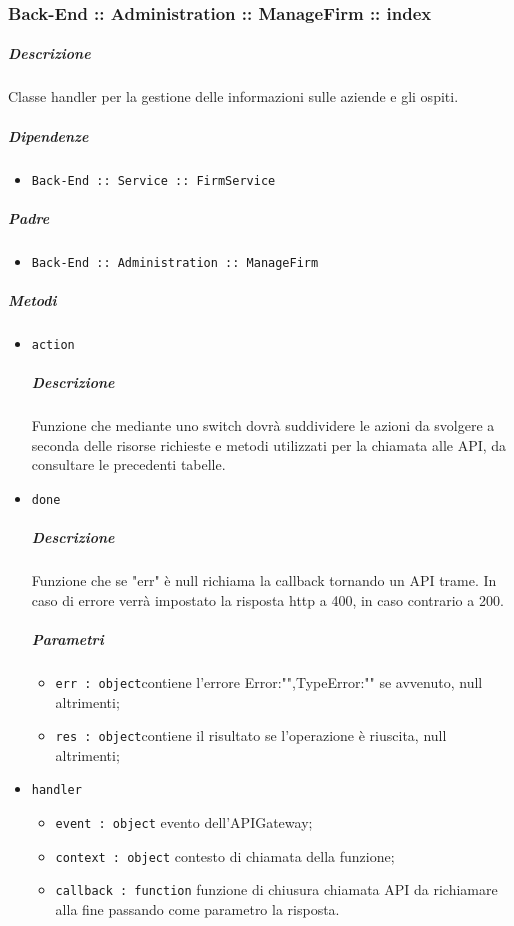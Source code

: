 \documentclass[../ManualeSviluppatore_v2.0.0.tex]{subfiles}
\begin{document}
\subsubsection{Back-End :: Administration :: ManageFirm :: index}
\subparagraph{Descrizione} Classe handler per la gestione delle informazioni sulle aziende e gli ospiti.
\subparagraph{Dipendenze}
\begin{itemize}
	\item \texttt{Back-End :: Service :: FirmService}
\end{itemize}
\subparagraph{Padre}
\begin{itemize}
	\item \texttt{Back-End :: Administration :: ManageFirm}
\end{itemize}
\subparagraph{Metodi}
\begin{itemize}
	\item \texttt{action}
	      \subparagraph{Descrizione} Funzione che mediante uno switch dovrà suddividere le azioni da svolgere a seconda delle risorse richieste e metodi utilizzati per la chiamata alle API, da consultare le precedenti tabelle.
	\item \texttt{done}
	      \subparagraph{Descrizione} Funzione che se "err" è null richiama la callback tornando un API trame. In caso di errore verrà impostato la risposta http a 400, in caso contrario a 200.
	      \subparagraph{Parametri}
	      \begin{itemize}
	      	\item \texttt{err : object}contiene l'errore {Error:"",TypeError:""} se avvenuto, null altrimenti;
	      	\item \texttt{res : object}contiene il risultato se l'operazione è riuscita, null altrimenti;
	      \end{itemize}
	\item \texttt{handler}
	      \begin{itemize}
	      	\item \texttt{event : object} evento dell'APIGateway;
	      	\item \texttt{context : object} contesto di chiamata della funzione;
	      	\item \texttt{callback : function} funzione di chiusura chiamata API da richiamare alla fine passando come parametro la risposta.
	      \end{itemize}
\end{itemize}
\end{document}
